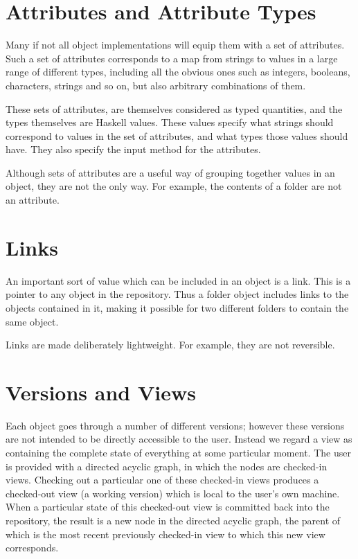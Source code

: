 \documentclass[a4paper]{article}
\begin{document}
\section{Attributes and Attribute Types}

Many if not all object implementations will equip them with a set of
attributes.  Such a set of attributes corresponds to a map from strings
to values in a large range of different types, including all the obvious
ones such as integers, booleans, characters, strings and so on, but also
arbitrary combinations of them.

These sets of attributes, are themselves considered as typed quantities,
and the types themselves are Haskell values.  These values specify what
strings should correspond to values in the set of attributes, and what types
those values should have.  They also specify the input method for the 
attributes.

Although sets of attributes are a useful way of grouping together values in
an object, they are not the only way.  For example, the contents of a folder
are not an attribute.

\section{Links}
An important sort of value which can be included in an object is
a link.  This is a pointer to any 
object in the repository.  Thus a folder object includes links to the objects 
contained in it, making it possible for two different folders to contain the
same object.

Links are made deliberately lightweight.  For example, they are not reversible.

\section{Versions and Views}
Each object goes through a number of different versions; however these versions
are not intended to be directly accessible to the user.  Instead we regard a
view as containing the complete state of everything at some particular moment.
The user is provided with a directed acyclic graph, in which the nodes are
checked-in views.  Checking out a particular one of these checked-in views
produces a checked-out view (a working version) 
which is local to the user's own machine.  When
a particular state of this checked-out view is committed back into the
repository, the result is a new node in the directed acyclic graph, the parent
of which is the most recent previously checked-in view to which this new
view corresponds.
\end{document}
